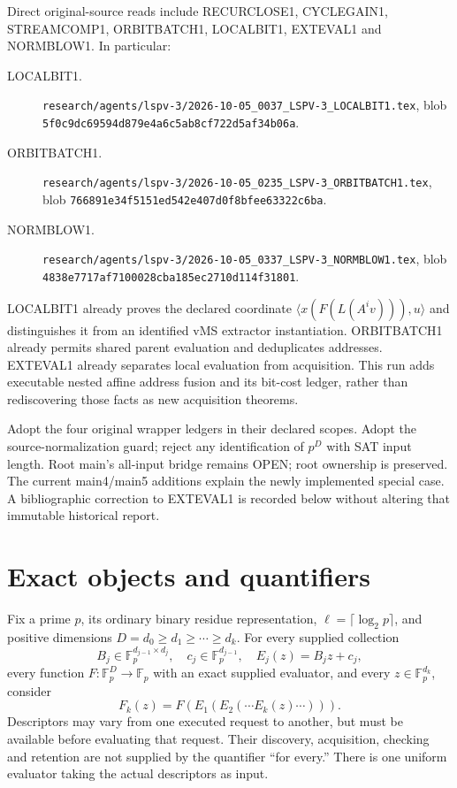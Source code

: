 \documentclass[11pt]{article}
\begin{document}
Direct original-source reads include RECURCLOSE1, CYCLEGAIN1, STREAMCOMP1,
ORBITBATCH1, LOCALBIT1, EXTEVAL1 and NORMBLOW1. In particular:
\begin{description}
\item[LOCALBIT1.] \nolinkurl{research/agents/lspv-3/2026-10-05_0037_LSPV-3_LOCALBIT1.tex},
blob \nolinkurl{5f0c9dc69594d879e4a6c5ab8cf722d5af34b06a}.
\item[ORBITBATCH1.] \nolinkurl{research/agents/lspv-3/2026-10-05_0235_LSPV-3_ORBITBATCH1.tex},
blob \nolinkurl{766891e34f5151ed542e407d0f8bfee63322c6ba}.
\item[NORMBLOW1.] \nolinkurl{research/agents/lspv-3/2026-10-05_0337_LSPV-3_NORMBLOW1.tex},
blob \nolinkurl{4838e7717af7100028cba185ec2710d114f31801}.
\end{description}
LOCALBIT1 already proves the declared coordinate
$\langle x(F(L(A^iv))),u\rangle$ and distinguishes it from an identified
vMS extractor instantiation. ORBITBATCH1 already permits shared parent
evaluation and deduplicates addresses. EXTEVAL1 already separates local
evaluation from acquisition. This run adds executable nested affine
address fusion and its bit-cost ledger, rather than rediscovering those
facts as new acquisition theorems.

Adopt the four original wrapper ledgers in their declared scopes.
Adopt the source-normalization guard; reject any identification of
$p^D$ with SAT input length. Root main's all-input bridge remains OPEN;
root ownership is preserved. The current main4/main5 additions explain
the newly implemented special case. A bibliographic correction to EXTEVAL1
is recorded below without altering that immutable historical report.

\section*{Exact objects and quantifiers}
Fix a prime $p$, its ordinary binary residue representation,
$\ell=\lceil\log_2p\rceil$, and positive dimensions
$D=d_0\ge d_1\ge\cdots\ge d_k$. For every supplied collection
\[
 B_j\in\mathbb F_p^{d_{j-1}\times d_j},\quad
 c_j\in\mathbb F_p^{d_{j-1}},\quad
 E_j(z)=B_jz+c_j,
\]
every function $F:\mathbb F_p^D\to\mathbb F_p$ with an exact supplied
evaluator, and every $z\in\mathbb F_p^{d_k}$, consider
\[
 F_k(z)=F(E_1(E_2(\cdots E_k(z)\cdots))).
\]
Descriptors may vary from one executed request to another, but must be
available before evaluating that request. Their discovery, acquisition,
checking and retention are not supplied by the quantifier ``for every.''
There is one uniform evaluator taking the actual descriptors as input.
\end{document}
